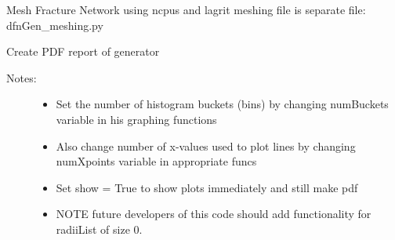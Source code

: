\documentclass[letterpaper,10pt,english]{sphinxmanual}
\begin{document}
\begin{fulllineitems}
\begin{fulllineitems}
\label{pydfnworks:pydfnworks.DFNWORKS.mesh_network}
Mesh Fracture Network using ncpus and lagrit
meshing file is separate file: dfnGen\_meshing.py

\end{fulllineitems}


\begin{fulllineitems}
\label{pydfnworks:pydfnworks.DFNWORKS.os}
\end{fulllineitems}


\begin{fulllineitems}
\label{pydfnworks:pydfnworks.DFNWORKS.output_report}
Create PDF report of generator
\begin{description}
\item[{Notes:}] \leavevmode\begin{itemize}
\item {} 
Set the number of histogram buckets (bins) by changing numBuckets variable in his graphing functions

\item {} 
Also change number of x-values used to plot lines by changing numXpoints variable in appropriate funcs

\item {} 
Set show = True to show plots immediately and still make pdf

\item {} 
NOTE future developers of this code should add functionality for radiiList of size 0.

\end{itemize}

\end{description}

\end{fulllineitems}


\end{fulllineitems}
\end{document}
